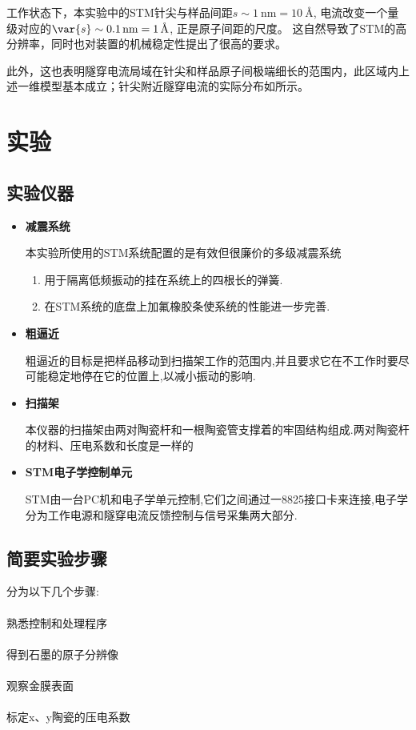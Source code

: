 \documentclass[a4paper]{article}
\begin{document}
工作状态下，本实验中的STM针尖与样品间距$s \sim \SI{1}{\nm} = \SI{10}{\angstrom}$, 电流改变一个量级对应的$\var{s} \sim \SI{0.1}{\nm} = \SI{1}{\angstrom}$, 正是原子间距的尺度。
这自然导致了STM的高分辨率，同时也对装置的机械稳定性提出了很高的要求。
	
此外，这也表明隧穿电流局域在针尖和样品原子间极端细长的范围内，此区域内上述一维模型基本成立；针尖附近隧穿电流的实际分布如所示。
\newpage
\section{实验} \label{experiment}%
\subsection{实验仪器}\label{sub:instruments}
\begin{itemize}
\item{\textbf{减震系统}}

本实验所使用的STM系统配置的是有效但很廉价的多级减震系统
\begin{enumerate}[(1)]
    \item 用于隔离低频振动的挂在系统上的四根长的弹簧.
    \item 在STM系统的底盘上加氟橡胶条使系统的性能进一步完善.
\end{enumerate}
\item{\textbf{粗逼近}}

粗逼近的目标是把样品移动到扫描架工作的范围内,并且要求它在不工作时要尽可能稳定地停在它的位置上,以减小振动的影响.
\item{\textbf{扫描架}}

本仪器的扫描架由两对陶瓷杆和一根陶瓷管支撑着的牢固结构组成.两对陶瓷杆的材料、压电系数和长度是一样的
\item{\textbf{STM电子学控制单元}}

STM由一台PC机和电子学单元控制,它们之间通过一8825接口卡来连接,电子学分为工作电源和隧穿电流反馈控制与信号采集两大部分.

\end{itemize}

\subsection{简要实验步骤}\label{sub:ExperimentalSteps}
分为以下几个步骤:\\\\
熟悉控制和处理程序\\\\
得到石墨的原子分辨像\\\\
观察金膜表面\\\\
标定x、y陶瓷的压电系数\\\\
\end{document}

